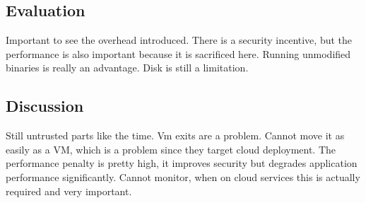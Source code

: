 %
% 
% 
% 
% 
% 
% 
% 
% 

\subsection{Evaluation}
Important to see the overhead introduced.
There is a security incentive, but the performance is also important because it is sacrificed here.
Running unmodified binaries is really an advantage.
Disk is still a limitation.


\subsection{Discussion}

Still untrusted parts like the time.
Vm exits are a problem.
Cannot move it as easily as a VM, which is a problem since they target cloud deployment.
The performance penalty is pretty high, it improves security but degrades application performance significantly.
Cannot monitor, when on cloud services this is actually required and very important.\\

